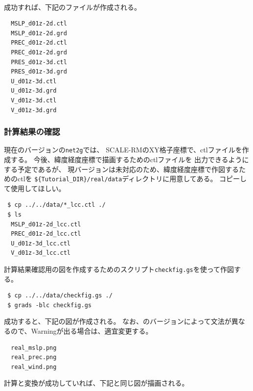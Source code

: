 \\

成功すれば、下記のファイルが作成される。
\begin{verbatim}
  MSLP_d01z-2d.ctl
  MSLP_d01z-2d.grd
  PREC_d01z-2d.ctl
  PREC_d01z-2d.grd
  PRES_d01z-3d.ctl
  PRES_d01z-3d.grd
  U_d01z-3d.ctl
  U_d01z-3d.grd
  V_d01z-3d.ctl
  V_d01z-3d.grd
\end{verbatim}


\subsubsection{計算結果の確認}
現在のバージョンの\verb|net2g|では、
SCALE-RMのXY格子座標で、ctlファイルを作成する。
今後、緯度経度座標で描画するためのctlファイルを
出力できるようにする予定であるが、
現バージョンは未対応のため、緯度経度座標で作図するためのctlを
\verb|${Tutorial_DIR}/real/data|ディレクトリに用意してある。
コピーして使用してほしい。
\begin{verbatim}
 $ cp ../../data/*_lcc.ctl ./
 $ ls
  MSLP_d01z-2d_lcc.ctl
  PREC_d01z-2d_lcc.ctl
  U_d01z-3d_lcc.ctl
  V_d01z-3d_lcc.ctl
\end{verbatim}

計算結果確認用の図を作成するためのスクリプト\verb|checkfig.gs|を使って作図する。
\begin{verbatim}
 $ cp ../../data/checkfig.gs ./
 $ grads -blc checkfig.gs
\end{verbatim}
成功すると、下記の図が作成される。
なお、\grads のバージョンによって文法が異なるので、Warningが出る場合は、適宜変更する。
\begin{verbatim}
  real_mslp.png
  real_prec.png
  real_wind.png
\end{verbatim}
計算と変換が成功していれば、下記と同じ図が描画される。

